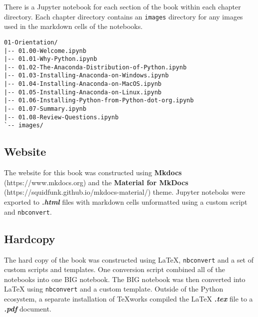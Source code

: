 \documentclass{book}
\newcommand{\passthrough}[1]{#1}
\begin{document}
There is a Jupyter notebook for each section of the book within each
chapter directory. Each chapter directory contains an
\passthrough{\lstinline!images!} directory for any images used in the
markdown cells of the notebooks.

\begin{lstlisting}
01-Orientation/
|-- 01.00-Welcome.ipynb
|-- 01.01-Why-Python.ipynb
|-- 01.02-The-Anaconda-Distribution-of-Python.ipynb
|-- 01.03-Installing-Anaconda-on-Windows.ipynb
|-- 01.04-Installing-Anaconda-on-MacOS.ipynb
|-- 01.05-Installing-Anaconda-on-Linux.ipynb
|-- 01.06-Installing-Python-from-Python-dot-org.ipynb
|-- 01.07-Summary.ipynb
|-- 01.08-Review-Questions.ipynb
`-- images/
\end{lstlisting}
    




    
        \hypertarget{website}{%
\subsection{Website}\label{website}}
    




    
        The website for this book was constructed using \textbf{Mkdocs}
(https://www.mkdocs.org) and the \textbf{Material for MkDocs}
(https://squidfunk.github.io/mkdocs-material/) theme. Jupyter noteboks
were exported to \textbf{\emph{.html}} files with markdown cells
unformatted using a custom script and
\passthrough{\lstinline!nbconvert!}.
    




    
        \hypertarget{hardcopy}{%
\subsection{Hardcopy}\label{hardcopy}}
    




    
        The hard copy of the book was constructed using LaTeX,
\passthrough{\lstinline!nbconvert!} and a set of custom scripts and
templates. One conversion script combined all of the notebooks into one
BIG notebook. The BIG notebook was then converted into LaTeX using
\passthrough{\lstinline!nbconvert!} and a custom template. Outside of
the Python ecosystem, a separate installation of TeXworks compiled the
LaTeX \textbf{\emph{.tex}} file to a \textbf{\emph{.pdf}} document.
    
\end{document}
